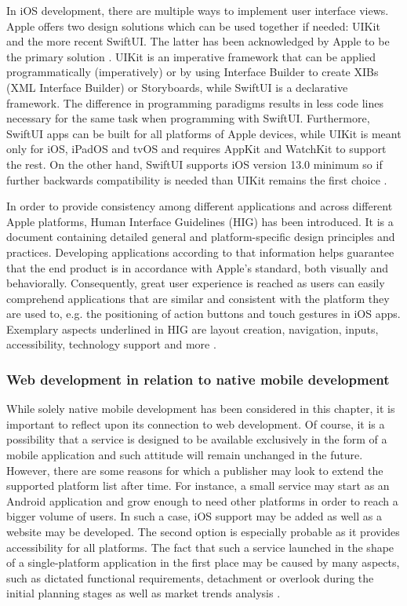 In iOS development, there are multiple ways to implement user interface views. Apple offers two design solutions which can be used together if needed: UIKit and the more recent SwiftUI. The latter has been acknowledged by Apple to be the primary solution \cite{comparison_technologies_multiplatform}. UIKit is an imperative framework that can be applied programmatically (imperatively) or by using Interface Builder to create XIBs (XML Interface Builder) or Storyboards, while SwiftUI is a declarative framework. The difference in programming paradigms results in less code lines necessary for the same task when programming with SwiftUI. Furthermore, SwiftUI apps can be built for all platforms of Apple devices, while UIKit is meant only for iOS, iPadOS and tvOS and requires AppKit and WatchKit to support the rest. On the other hand, SwiftUI supports iOS version 13.0 minimum so if further backwards compatibility is needed than UIKit remains the first choice \cite{swiftui_overview}\cite{xib_why_use}\cite{swiftui_uikit}.

In order to provide consistency among different applications and across different Apple platforms, Human Interface Guidelines (HIG) has been introduced. It is a document containing detailed general and platform-specific design principles and practices. Developing applications according to that information helps guarantee that the end product is in accordance with Apple's standard, both visually and behaviorally. Consequently, great user experience is reached as users can easily comprehend applications that are similar and consistent with the platform they are used to, e.g. the positioning of action buttons and touch gestures in iOS apps. Exemplary aspects underlined in HIG are layout creation, navigation, inputs, accessibility, technology support and more \cite{hig_overview}.

\subsubsection{Web development in relation to native mobile development}

While solely native mobile development has been considered in this chapter, it is important to reflect upon its connection to web development. Of course, it is a possibility that a service is designed to be available exclusively in the form of a mobile application and such attitude will remain unchanged in the future. However, there are some reasons for which a publisher may look to extend the supported platform list after time. For instance, a small service may start as an Android application and grow enough to need other platforms in order to reach a bigger volume of users. In such a case, iOS support may be added as well as a website may be developed. The second option is especially probable as it provides accessibility for all platforms. The fact that such a service launched in the shape of a single-platform application in the first place may be caused by many aspects, such as dictated functional requirements, detachment or overlook during the initial planning stages as well as market trends analysis \cite{web_mobile_app}.

